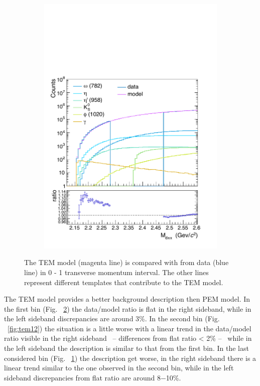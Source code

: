 \begin{figure}
\begin{subfigure}{.33\textwidth}
  \includegraphics[width=\linewidth]{gfx/can2}
  \caption{}
  \label{fig:tem23}
\end{subfigure}
\caption{The TEM model (magenta line) is compared with \minv from data (blue line) in 0 - 1 \gevc transverse momentum interval. The other lines represent different templates that contribute to the TEM model.}
\label{fig:tem01}
\end{figure}

The TEM model provides a better background description then PEM model. In the first \pt bin
(Fig. ~\ref{fig:tem01}) the data/model ratio is flat in the right sideband, while in the left sideband discrepancies
are around 3\%. In the second bin (Fig. ~\ref{fig:tem12}) the situation is a little worse with a linear trend
in the data/model ratio visible in the right sideband \ -- differences from flat ratio < 2\% -- \ while in
the left sideband the description is similar to that from the first bin. In the last considered bin
(Fig. ~\ref{fig:tem23}) the description get worse, in the right sideband there is a linear trend similar to
the one observed in the second bin, while in the left sideband discrepancies from flat ratio are
around 8−10\%.

